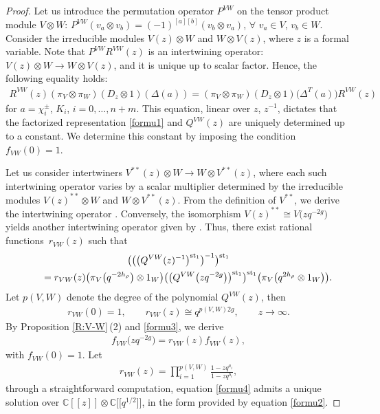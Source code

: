 \documentclass[pdftex]{sigma}
\numberwithin{equation}{section}
\begin{document}
\begin{proof}
Let us introduce the permutation operator $P^{VW}$ on the tensor product module $V\otimes W$: $P^{VW}(v_a\otimes v_b)=(-1)^{[a][b]}(v_b\otimes v_a)$, $\forall$ $v_a\in V$, $v_b\in W$. Consider the irreducible modules $V(z)\otimes W$ and $W\otimes V(z)$, where $z$ is a formal variable. Note that $P^{VW}R^{VW}(z)$ is an intertwining operator: $V(z)\otimes W\rightarrow W\otimes V(z)$, and it is unique up to scalar factor.
Hence, the following equality holds:
\begin{gather*}
 R^{VW}(z)(\pi_V\otimes\pi_W)(D_z\otimes1)(\Delta(a))=(\pi_V\otimes\pi_W)(D_z\otimes1)\bigl(\Delta^T(a)\bigr)R^{VW}(z)
\end{gather*}
for $a=\chi_i^{\pm}$, $K_i$, $i=0,\dots,n+m$. This equation, linear over $z$, $z^{-1}$, dictates that the factorized representation \eqref{formu1} and $Q^{VW}(z)$ are uniquely determined up to a constant. We determine this constant by imposing the condition $f_{VW}(0)=1$.

Let us consider intertwiners $V^{\ast\ast}(z)\otimes W\rightarrow W\otimes V^{\ast\ast}(z)$, where each such intertwining operator varies by a scalar multiplier determined by the irreducible modules $V(z)^{\ast\ast}\otimes W$ and $W\otimes V^{\ast\ast}(z)$. From the definition of $V^{\ast\ast}$, we derive the intertwining operator . Conversely, the isomorphism $V(z)^{\ast\ast}\cong V\bigl(zq^{-2g}\bigr)$ yields another intertwining operator given by
 . Thus, there exist rational functions~$r_{VW}(z)$ such that
\begin{gather}
 \bigl(\bigl(\bigl(Q^{VW}(z)^{-1}\bigr)^{{\rm st}_1}\bigr)^{-1}\bigr)^{{\rm st}_1}\nonumber\\
 \qquad=r_{VW}(z)\bigl(\pi_V\bigl(q^{-2h_\rho}\bigr)\otimes1_W\bigr)
\bigl(\bigl(Q^{VW}\bigl(zq^{-2g}\bigr)\bigr)^{{\rm st}_1}\bigr)^{{\rm st}_1}\bigl(\pi_V\bigl(q^{2h_\rho}\otimes1_W\bigr)\bigr).\label{formu3}
\end{gather}
Let $p(V,W)$ denote the degree of the polynomial $Q^{VW}(z)$, then
\begin{gather*}
 r_{VW}(0)=1,\qquad r_{VW}(z)\cong q^{p(V,W)2g},\qquad z\rightarrow\infty.
\end{gather*}
By Proposition \ref{R:V-W}\,(2) and \eqref{formu3}, we derive
\begin{gather}\label{formu4}
 f_{VW}\bigl(zq^{-2g}\bigr)= r_{VW}(z) f_{VW}(z),
\end{gather}
with $f_{VW}(0)=1$.
Let
\begin{gather*}%
 r_{VW}(z)=\prod\limits_{i=1}^{p(V,W)}\frac{1-zq^{a_i}}{1-zq^{b_i}},
\end{gather*}
through a straightforward computation, equation \eqref{formu4} admits a unique solution over $\mathbb{C}[[z]]\otimes\mathbb{C}\bigl[\bigl[q^{1/2}\bigr]\bigr]$, in the form provided by equation \eqref{formu2}.
\end{proof}
\end{document}
